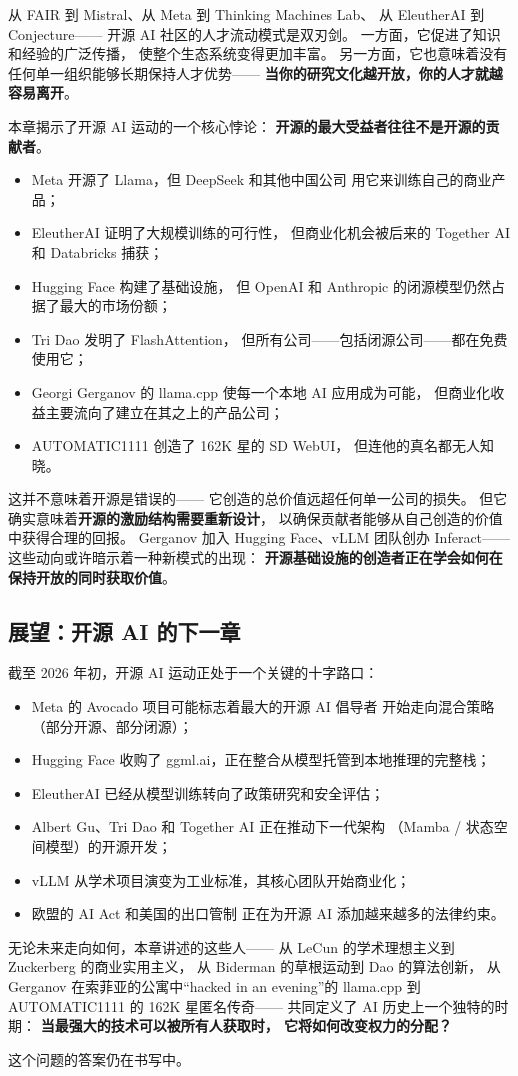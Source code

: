 从 FAIR 到 Mistral、从 Meta 到 Thinking Machines Lab、
从 EleutherAI 到 Conjecture——
开源 AI 社区的人才流动模式是双刃剑。
一方面，它促进了知识和经验的广泛传播，
使整个生态系统变得更加丰富。
另一方面，它也意味着没有任何单一组织能够长期保持人才优势——
\textbf{当你的研究文化越开放，你的人才就越容易离开}。

\begin{keybox}[开源 AI 的核心悖论]
本章揭示了开源 AI 运动的一个核心悖论：
\textbf{开源的最大受益者往往不是开源的贡献者}。
\begin{itemize}
  \item Meta 开源了 Llama，但 DeepSeek 和其他中国公司
    用它来训练自己的商业产品；
  \item EleutherAI 证明了大规模训练的可行性，
    但商业化机会被后来的 Together AI 和 Databricks 捕获；
  \item Hugging Face 构建了基础设施，
    但 OpenAI 和 Anthropic 的闭源模型仍然占据了最大的市场份额；
  \item Tri Dao 发明了 FlashAttention，
    但所有公司——包括闭源公司——都在免费使用它；
  \item Georgi Gerganov 的 llama.cpp 使每一个本地 AI 应用成为可能，
    但商业化收益主要流向了建立在其之上的产品公司；
  \item AUTOMATIC1111 创造了 162K 星的 SD WebUI，
    但连他的真名都无人知晓。
\end{itemize}
这并不意味着开源是错误的——
它创造的总价值远超任何单一公司的损失。
但它确实意味着\textbf{开源的激励结构需要重新设计}，
以确保贡献者能够从自己创造的价值中获得合理的回报。
Gerganov 加入 Hugging Face、vLLM 团队创办 Inferact——
这些动向或许暗示着一种新模式的出现：
\textbf{开源基础设施的创造者正在学会如何在保持开放的同时获取价值}。
\end{keybox}

\subsection{展望：开源 AI 的下一章}

截至 2026 年初，开源 AI 运动正处于一个关键的十字路口：

\begin{itemize}
  \item Meta 的 Avocado 项目可能标志着最大的开源 AI 倡导者
    开始走向混合策略（部分开源、部分闭源）；
  \item Hugging Face 收购了 ggml.ai，正在整合从模型托管到本地推理的完整栈；
  \item EleutherAI 已经从模型训练转向了政策研究和安全评估；
  \item Albert Gu、Tri Dao 和 Together AI 正在推动下一代架构
    （Mamba / 状态空间模型）的开源开发；
  \item vLLM 从学术项目演变为工业标准，其核心团队开始商业化；
  \item 欧盟的 AI Act 和美国的出口管制
    正在为开源 AI 添加越来越多的法律约束。
\end{itemize}

无论未来走向如何，本章讲述的这些人——
从 LeCun 的学术理想主义到 Zuckerberg 的商业实用主义，
从 Biderman 的草根运动到 Dao 的算法创新，
从 Gerganov 在索菲亚的公寓中``hacked in an evening''的 llama.cpp
到 AUTOMATIC1111 的 162K 星匿名传奇——
共同定义了 AI 历史上一个独特的时期：
\textbf{当最强大的技术可以被所有人获取时，
它将如何改变权力的分配？}

这个问题的答案仍在书写中。
